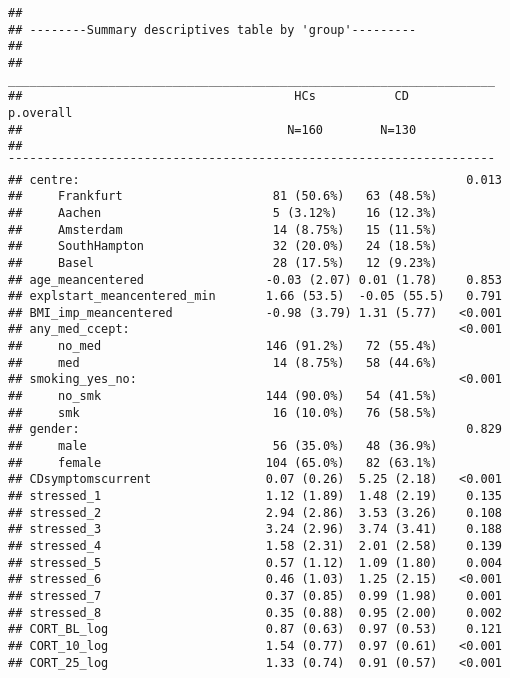 \documentclass[
]{article}
\begin{document}
\begin{verbatim}
## 
## --------Summary descriptives table by 'group'---------
## 
## ____________________________________________________________________ 
##                                      HCs           CD      p.overall 
##                                     N=160        N=130               
## ¯¯¯¯¯¯¯¯¯¯¯¯¯¯¯¯¯¯¯¯¯¯¯¯¯¯¯¯¯¯¯¯¯¯¯¯¯¯¯¯¯¯¯¯¯¯¯¯¯¯¯¯¯¯¯¯¯¯¯¯¯¯¯¯¯¯¯¯ 
## centre:                                                      0.013   
##     Frankfurt                     81 (50.6%)   63 (48.5%)            
##     Aachen                        5 (3.12%)    16 (12.3%)            
##     Amsterdam                     14 (8.75%)   15 (11.5%)            
##     SouthHampton                  32 (20.0%)   24 (18.5%)            
##     Basel                         28 (17.5%)   12 (9.23%)            
## age_meancentered                 -0.03 (2.07) 0.01 (1.78)    0.853   
## explstart_meancentered_min       1.66 (53.5)  -0.05 (55.5)   0.791   
## BMI_imp_meancentered             -0.98 (3.79) 1.31 (5.77)   <0.001   
## any_med_ccept:                                              <0.001   
##     no_med                       146 (91.2%)   72 (55.4%)            
##     med                           14 (8.75%)   58 (44.6%)            
## smoking_yes_no:                                             <0.001   
##     no_smk                       144 (90.0%)   54 (41.5%)            
##     smk                           16 (10.0%)   76 (58.5%)            
## gender:                                                      0.829   
##     male                          56 (35.0%)   48 (36.9%)            
##     female                       104 (65.0%)   82 (63.1%)            
## CDsymptomscurrent                0.07 (0.26)  5.25 (2.18)   <0.001   
## stressed_1                       1.12 (1.89)  1.48 (2.19)    0.135   
## stressed_2                       2.94 (2.86)  3.53 (3.26)    0.108   
## stressed_3                       3.24 (2.96)  3.74 (3.41)    0.188   
## stressed_4                       1.58 (2.31)  2.01 (2.58)    0.139   
## stressed_5                       0.57 (1.12)  1.09 (1.80)    0.004   
## stressed_6                       0.46 (1.03)  1.25 (2.15)   <0.001   
## stressed_7                       0.37 (0.85)  0.99 (1.98)    0.001   
## stressed_8                       0.35 (0.88)  0.95 (2.00)    0.002   
## CORT_BL_log                      0.87 (0.63)  0.97 (0.53)    0.121   
## CORT_10_log                      1.54 (0.77)  0.97 (0.61)   <0.001   
## CORT_25_log                      1.33 (0.74)  0.91 (0.57)   <0.001   

\end{verbatim}
\end{document}

